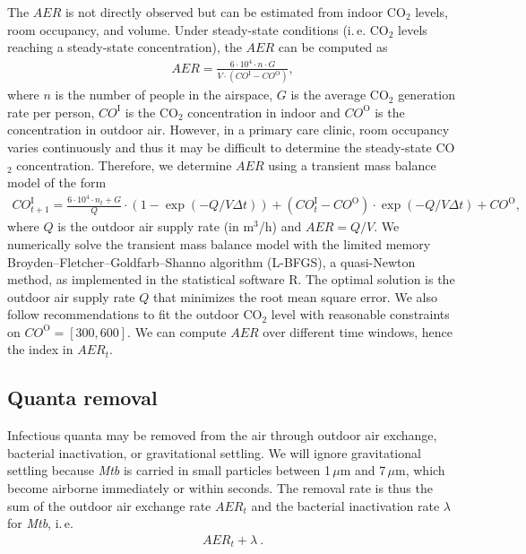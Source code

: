 \documentclass[fleqn,11pt]{wlscirep_supp}
\newcommand\ie{i.\,e.\xspace}
\begin{document}
The $AER$ is not directly observed but can be estimated from indoor CO$_2$ levels, room occupancy, and volume. Under steady-state conditions (\ie CO$_2$ levels reaching a steady-state concentration), the $AER$ can be computed as
\begin{align}
    AER = \frac{6\cdot10^4 \cdot n \cdot G}{V\cdot(CO^{\text{I}}-CO^{\text{O}})},
\end{align}
where $n$ is the number of people in the airspace, $G$ is the average CO$_2$ generation rate per person, $CO^{\text{I}}$ is the CO$_2$ concentration in indoor and $CO^{\text{O}}$ is the concentration in outdoor air\cite{Batterman2017IJERPH}. However, in a primary care clinic, room occupancy varies continuously and thus it may be difficult to determine the steady-state CO$_2$ concentration. Therefore, we determine $AER$ using a transient mass balance model of the form\cite{Batterman2017IJERPH}
\begin{align}
    CO_{t+1}^{\text{I}} = \frac{6\cdot10^4 \cdot n_t + G}{Q} \cdot \left(1 - \exp(-Q/V \Delta t)\right) + (CO_t^{\text{I}}-CO^{\text{O}}) \cdot \exp(-Q/V \Delta t) + CO^{\text{O}},
\end{align}
where $Q$ is the outdoor air supply rate (in m$^3$/h) and $AER = Q/V$. We numerically solve the transient mass balance model with the limited memory Broyden–Fletcher–Goldfarb–Shanno algorithm (L-BFGS), a quasi-Newton method, as implemented in the statistical software R\cite{Byrd1995SIAM}. The optimal solution is the outdoor air supply rate $Q$ that minimizes the root mean square error. We also follow recommendations to fit the outdoor CO$_2$ level with reasonable constraints on $CO^{\text{O}} = [300,600]$\cite{Batterman2017IJERPH}. We can compute $AER$ over different time windows, hence the index in $AER_t$.

\subsection{Quanta removal}\label{sec:quanta-removal}

Infectious quanta may be removed from the air through outdoor air exchange, bacterial inactivation, or gravitational settling. We will ignore gravitational settling because \emph{Mtb} is carried in small particles between 1\,$\mu$m and 7\,$\mu$m\cite{Fennelly2020Lancet}, which become airborne immediately or within seconds\cite{Vuorinen2020SafSci}. The removal rate is thus the sum of the outdoor air exchange rate $AER_t$ and the bacterial inactivation rate $\lambda$ for \emph{Mtb}, \ie 
\begin{align}\label{eq:removal}
    AER_t + \lambda ~.
\end{align}
\end{document}

